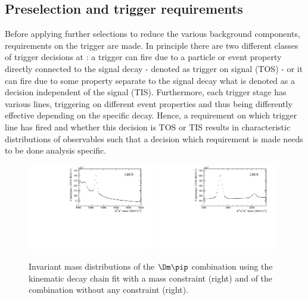 \subsection{Preselection and trigger requirements}
\label{sec:preselTrigger}

Before applying further selections to reduce the various background components, requirements on the trigger are made.
In principle there are two different classes of trigger decisions at \lhcb: a trigger can fire due to a particle or event property directly connected to the signal decay - denoted as trigger on signal (TOS) - or it can fire due to some property separate to the signal decay what is denoted as a decision independent of the signal (TIS).
Furthermore, each trigger stage has various lines, triggering on different event properties and thus being differently effective depending on the specific decay.
Hence, a requirement on which trigger line has fired and whether this decision is TOS or TIS results in characteristic distributions of observables such that a decision which requirement is made needs to be done analysis specific.
\begin{figure}[tbp]
    \centering
    \includegraphics[width=0.485\textwidth]{07selection/figs/Bmass_afterStrippingAndTrigger.pdf}
    \includegraphics[width=0.485\textwidth]{07selection/figs/Dmass_afterStrippingAndTrigger.pdf}
    \caption{Invariant mass distributions of the $\Dm\pip$ combination using the kinematic decay chain fit with a \Dm mass constraint (right) and of the \Kp\pim\pim combination without any constraint (right).}
    \label{fig:BAndDmassAfterStripping}
\end{figure}

